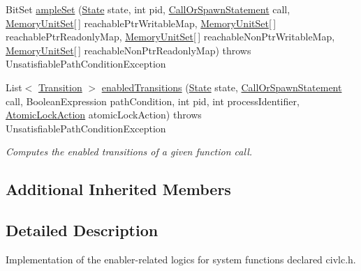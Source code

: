 \begin{DoxyCompactItemize}
Bit\+Set \hyperlink{classedu_1_1udel_1_1cis_1_1vsl_1_1civl_1_1library_1_1civlc_1_1LibcivlcEnabler_ad60216ddf400b81d18e3f6175a082697}{ample\+Set} (\hyperlink{interfaceedu_1_1udel_1_1cis_1_1vsl_1_1civl_1_1state_1_1IF_1_1State}{State} state, int pid, \hyperlink{interfaceedu_1_1udel_1_1cis_1_1vsl_1_1civl_1_1model_1_1IF_1_1statement_1_1CallOrSpawnStatement}{Call\+Or\+Spawn\+Statement} call, \hyperlink{interfaceedu_1_1udel_1_1cis_1_1vsl_1_1civl_1_1state_1_1IF_1_1MemoryUnitSet}{Memory\+Unit\+Set}\mbox{[}$\,$\mbox{]} reachable\+Ptr\+Writable\+Map, \hyperlink{interfaceedu_1_1udel_1_1cis_1_1vsl_1_1civl_1_1state_1_1IF_1_1MemoryUnitSet}{Memory\+Unit\+Set}\mbox{[}$\,$\mbox{]} reachable\+Ptr\+Readonly\+Map, \hyperlink{interfaceedu_1_1udel_1_1cis_1_1vsl_1_1civl_1_1state_1_1IF_1_1MemoryUnitSet}{Memory\+Unit\+Set}\mbox{[}$\,$\mbox{]} reachable\+Non\+Ptr\+Writable\+Map, \hyperlink{interfaceedu_1_1udel_1_1cis_1_1vsl_1_1civl_1_1state_1_1IF_1_1MemoryUnitSet}{Memory\+Unit\+Set}\mbox{[}$\,$\mbox{]} reachable\+Non\+Ptr\+Readonly\+Map)  throws Unsatisfiable\+Path\+Condition\+Exception 
\item 
List$<$ \hyperlink{interfaceedu_1_1udel_1_1cis_1_1vsl_1_1civl_1_1semantics_1_1IF_1_1Transition}{Transition} $>$ \hyperlink{classedu_1_1udel_1_1cis_1_1vsl_1_1civl_1_1library_1_1civlc_1_1LibcivlcEnabler_a7e233e81b1e86cee395f966e08873891}{enabled\+Transitions} (\hyperlink{interfaceedu_1_1udel_1_1cis_1_1vsl_1_1civl_1_1state_1_1IF_1_1State}{State} state, \hyperlink{interfaceedu_1_1udel_1_1cis_1_1vsl_1_1civl_1_1model_1_1IF_1_1statement_1_1CallOrSpawnStatement}{Call\+Or\+Spawn\+Statement} call, Boolean\+Expression path\+Condition, int pid, int process\+Identifier, \hyperlink{enumedu_1_1udel_1_1cis_1_1vsl_1_1civl_1_1semantics_1_1IF_1_1Transition_1_1AtomicLockAction}{Atomic\+Lock\+Action} atomic\+Lock\+Action)  throws Unsatisfiable\+Path\+Condition\+Exception 
\begin{DoxyCompactList}\small\item\em Computes the enabled transitions of a given function call. \end{DoxyCompactList}\end{DoxyCompactItemize}
\subsection*{Additional Inherited Members}


\subsection{Detailed Description}
Implementation of the enabler-\/related logics for system functions declared civlc.\+h. 

